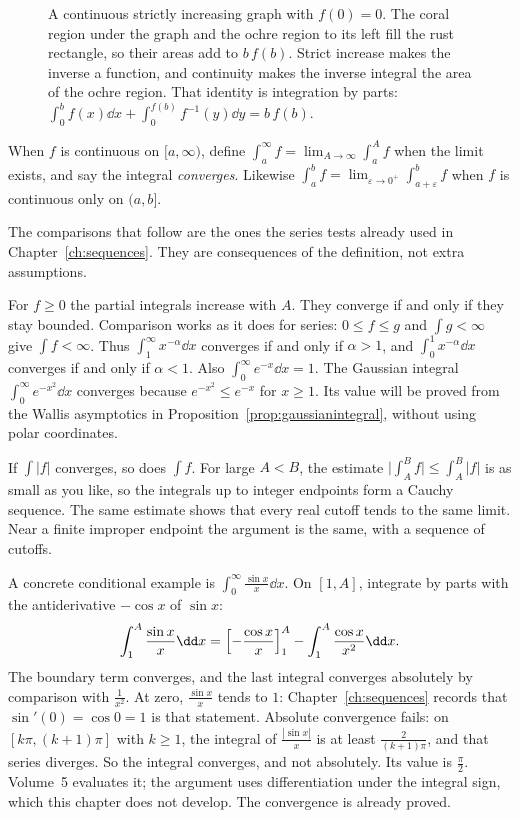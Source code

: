 \begin{figure}[ht]
\centering
{}
\caption{A continuous strictly increasing graph with $f(0)=0$. The coral region under the graph and the ochre region to its left fill the rust rectangle, so their areas add to $b\,f(b)$. Strict increase makes the inverse a function, and continuity makes the inverse integral the area of the ochre region. That identity is integration by parts: $\int_0^b f(x)\dd x+\int_0^{f(b)}f^{-1}(y)\dd y=b\,f(b)$.}
\label{fig:parts}
\end{figure}

\begin{definitionx}
When $f$ is continuous on $[a,\infty)$, define $\int_a^\infty f=\lim_{A\to\infty}\int_a^A f$ when the limit exists, and say the integral \emph{converges}. Likewise $\int_a^b f=\lim_{\varepsilon\to0^+}\int_{a+\varepsilon}^b f$ when $f$ is continuous only on $(a,b]$.
\end{definitionx}

The comparisons that follow are the ones the series tests already used in Chapter~\ref{ch:sequences}. They are consequences of the definition, not extra assumptions.

For $f\ge0$ the partial integrals increase with $A$. They converge if and only if they stay bounded. Comparison works as it does for series: $0\le f\le g$ and $\int g<\infty$ give $\int f<\infty$. Thus $\int_1^\infty x^{-\alpha}\dd x$ converges if and only if $\alpha>1$, and $\int_0^1 x^{-\alpha}\dd x$ converges if and only if $\alpha<1$. Also $\int_0^\infty e^{-x}\dd x=1$. The Gaussian integral $\int_0^\infty e^{-x^2}\dd x$ converges because $e^{-x^2}\le e^{-x}$ for $x\ge1$. Its value will be proved from the Wallis asymptotics in Proposition~\ref{prop:gaussianintegral}, without using polar coordinates.

If $\int|f|$ converges, so does $\int f$. For large $A<B$, the estimate $\bigl|\int_A^B f\bigr|\le\int_A^B|f|$ is as small as you like, so the integrals up to integer endpoints form a Cauchy sequence. The same estimate shows that every real cutoff tends to the same limit. Near a finite improper endpoint the argument is the same, with a sequence of cutoffs.

A concrete conditional example is $\int_0^\infty\frac{\sin x}x\dd x$. On $[1,A]$, integrate by parts with the antiderivative $-\cos x$ of $\sin x$:
\[
\int_1^A\frac{\sin x}x\dd x=\Bigl[-\frac{\cos x}x\Bigr]_1^A-\int_1^A\frac{\cos x}{x^2}\dd x.
\]
The boundary term converges, and the last integral converges absolutely by comparison with $\frac1{x^2}$. At zero, $\frac{\sin x}x$ tends to $1$: Chapter~\ref{ch:sequences} records that $\sin'(0)=\cos 0=1$ is that statement. Absolute convergence fails: on $[k\pi,(k+1)\pi]$ with $k\ge1$, the integral of $\frac{|\sin x|}x$ is at least $\frac2{(k+1)\pi}$, and that series diverges. So the integral converges, and not absolutely. Its value is $\frac\pi2$. Volume~5 evaluates it; the argument uses differentiation under the integral sign, which this chapter does not develop. The convergence is already proved.

